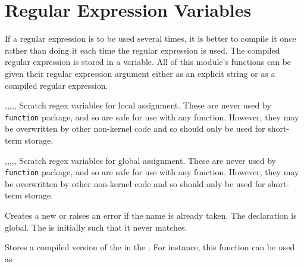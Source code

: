 \documentclass[oneside]{book}
\begin{document}
\section{Regular Expression Variables}

If a regular expression is to be used several times,
it is better to compile it once rather than doing it
each time the regular expression is used. The compiled
regular expression is stored in a variable. All
of this module's functions can be given their
regular expression argument either as an explicit string
or as a compiled regular expression.

\begin{variable}{\lTmpaRegex,\lTmpbRegex,\lTmpcRegex,\lTmpiRegex,\lTmpjRegex,\lTmpkRegex}
Scratch regex variables for local assignment. These are never used by
\verb!function! package, and so are safe for use with any function.
However, they may be overwritten by other non-kernel
code and so should only be used for short-term storage.
\end{variable}

\begin{variable}{\gTmpaRegex,\gTmpbRegex,\gTmpcRegex,\gTmpiRegex,\gTmpjRegex,\gTmpkRegex}
Scratch regex variables for global assignment. These are never used by
\verb!function! package, and so are safe for use with any function.
However, they may be overwritten by other non-kernel
code and so should only be used for short-term storage.
\end{variable}

\begin{function}{\regexNew}
\begin{syntax}
 
\end{syntax}
Creates a new  or raises an error if the
name is already taken. The declaration is global. The
 is initially such that it never matches.
\end{function}

\begin{function}{\regexSet}
\begin{syntax}
  
\end{syntax}
Stores a compiled version of the  in the
. For instance, this function can be
used as
\begin{codehigh}
\regexNew \lMyRegex
\regexSet {}
\end{codehigh}
\end{function}
\end{document}
